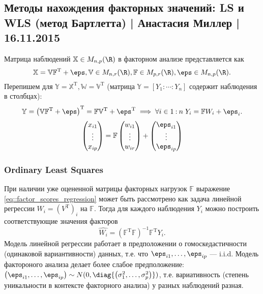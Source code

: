     \subsection{Методы нахождения факторных значений: LS и WLS (метод Бартлетта) | Анастасия Миллер | 16.11.2015}
      \newcommand{\tr}{\mathrm T}
      Матрица наблюдений $\mathbb X \in M_{n, p}(\R)$ в факторном анализе представляется как 
      $$\mathbb X = \mathbb V \mathbb F^\tr + \boldsymbol\eps, \mathbb V \in M_{n, r}(\R), \mathbb F \in M_{p, r}(\R), \boldsymbol\eps \in M_{n, p}(\R).$$
      Перепишем для $\mathbb Y = \mathbb X^\tr, \mathbb W = \mathbb V^\tr$ (матрица $\mathbb Y = \left[Y_1:\cdots:Y_n\right]$ содержит наблюдения в столбцах):
      $$\mathbb Y = \left(\mathbb V \mathbb F^\tr+ \boldsymbol\eps\right)^\tr = \mathbb F \mathbb V ^\tr + \boldsymbol\eps^\tr \implies \forall i\in 1\mathbin{:}n\; Y_i = \mathbb F W_i + \boldsymbol\eps_i.$$
      \begin{equation}\label{eq::factor_scores_regression}
        \begin{pmatrix}x_{i1} \\ \vdots \\ x_{ip}\end{pmatrix} = \mathbb F \begin{pmatrix}w_{i1} \\ \vdots \\ w_{ir}\end{pmatrix} + \begin{pmatrix}\eps_{i1} \\ \vdots \\ \eps_{ip}\end{pmatrix}
      \end{equation}
      
      \subsubsection{Ordinary Least Squares}
        При наличии уже оцененной матрицы факторных нагрузок $\mathbb F$ выражение \ref{eq::factor_scores_regression} может быть рассмотрено как задача линейной регрессии $W_i = (V^\tr)_i$ на $\mathbb F$. Тогда для каждого наблюдения $Y_i$ можно построить соответствующие значения факторов
        $$\hat{W_i} = \left(\mathbb F^\tr \mathbb F\right)^{-1}\mathbb F^\tr Y_i.$$
        Модель линейной регрессии работает в предположении о гомоскедастичности (одинаковой вариантивности) данных, т.е. что $\eps_{i1}, \ldots, \eps_{ip}$ --- i.i.d. Модель фактороного анализа делает более слабое предположение: $\left(\eps_{i1}, \ldots, \eps_{ip}\right) \sim N(0, \diag{\left(\sigma_1^2, \ldots, \sigma_p^2\right)})$, т.е. вариативность (степень уникальности в контексте факторного анализа) у разных наблюдений разная.
      
